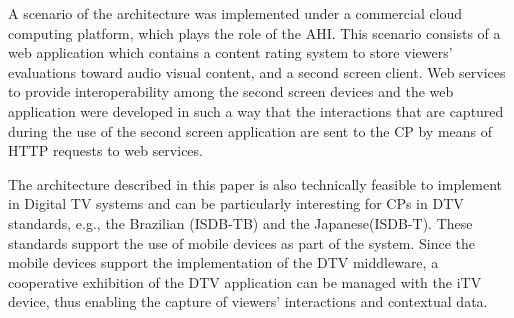 \documentclass[journal]{IEEEtran}
\begin{document}
A scenario of the architecture was implemented under a commercial cloud computing platform, which plays the role of the AHI. This scenario consists of a web application which contains a content rating system to store  viewers' evaluations toward audio visual content, and a second screen client. Web services to provide interoperability among the second screen devices and the web application were developed in such a way that the interactions that are captured during the use of the second screen application are sent to the CP by means of HTTP requests to web services.

The architecture described in this paper is also technically feasible to implement in Digital TV systems and can be particularly interesting for CPs in DTV standards, e.g., the Brazilian (ISDB-TB) and the Japanese(ISDB-T). These standards support the use of mobile devices as part of the system. Since the mobile devices support the implementation of the DTV middleware, a cooperative exhibition of the DTV application can be managed with the iTV device, thus enabling the capture of viewers' interactions and contextual data.





\end{document}
